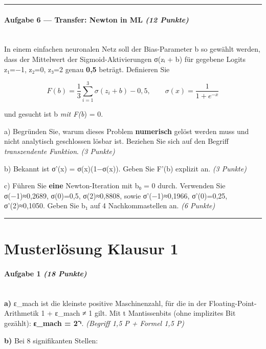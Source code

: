 \documentclass[11pt, a4paper]{article}
\begin{document}
\noindent\textcolor{rulegray}{\rule{\linewidth}{0.4pt}}


\paragraph{Aufgabe 6 — Transfer: Newton in ML \textit{(12 Punkte)}}\mbox{}\\[2pt]

In einem einfachen neuronalen Netz soll der Bias-Parameter b so gewählt werden, dass der Mittelwert der Sigmoid-Aktivierungen σ(zᵢ + b) für gegebene Logits z₁=−1, z₂=0, z₃=2 genau \textbf{0,5} beträgt. Definieren Sie


\[
F(b) = \frac{1}{3}\sum_{i=1}^{3} \sigma(z_i + b) - 0{,}5, \qquad \sigma(x) = \frac{1}{1+e^{-x}}
\]


und gesucht ist b\textit{ mit F(b}) = 0.


a) Begründen Sie, warum dieses Problem \textbf{numerisch} gelöst werden muss und nicht analytisch geschlossen lösbar ist. Beziehen Sie sich auf den Begriff \textit{transzendente Funktion}. \textit{(3 Punkte)}


b) Bekannt ist σ'(x) = σ(x)(1−σ(x)). Geben Sie F'(b) explizit an. \textit{(3 Punkte)}


c) Führen Sie \textbf{eine} Newton-Iteration mit b₀ = 0 durch. Verwenden Sie σ(−1)≈0,2689, σ(0)=0,5, σ(2)≈0,8808, sowie σ'(−1)≈0,1966, σ'(0)=0,25, σ'(2)≈0,1050. Geben Sie b₁ auf 4 Nachkommastellen an. \textit{(6 Punkte)}



\noindent\textcolor{rulegray}{\rule{\linewidth}{0.4pt}}



\section{Musterlösung Klausur 1}

\paragraph{Aufgabe 1 \textit{(18 Punkte)}}\mbox{}\\[2pt]

\textbf{a)} ε\_mach ist die kleinste positive Maschinenzahl, für die in der Floating-Point-Arithmetik 1 + ε\_mach ≠ 1 gilt. Mit t Mantissenbits (ohne implizites Bit gezählt): \textbf{ε\_mach = 2⁻ᵗ}. \textit{(Begriff 1,5 P + Formel 1,5 P)}


\textbf{b)} Bei 8 signifikanten Stellen:
\end{document}
